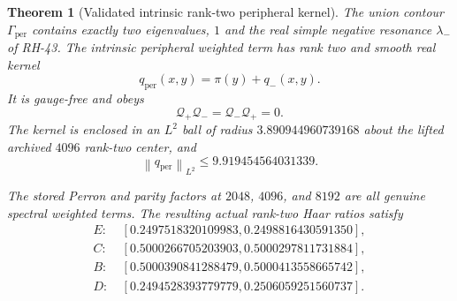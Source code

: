 \documentclass[11pt]{article}
\newtheorem{theorem}{Theorem}[section]
\theoremstyle{definition}
\theoremstyle{remark}
\newcommand{\cQ}{\mathcal Q}
\newcommand{\norm}[1]{\left\lVert #1\right\rVert}
\begin{document}
\begin{theorem}[Validated intrinsic rank-two peripheral kernel]
\label{thm:rank-two}
The union contour $\Gamma_{\mathrm{per}}$ contains exactly two eigenvalues,
$1$ and the real simple negative resonance $\lambda_-$ of RH-43.  The
intrinsic peripheral weighted term has rank two and smooth real kernel
\begin{equation}
 q_{\mathrm{per}}(x,y)=\pi(y)+q_-(x,y).
 \label{eq:rank-two-kernel}
\end{equation}
It is gauge-free and obeys
\begin{equation}
 \cQ_+\cQ_-=\cQ_-\cQ_+=0.
 \label{eq:weighted-orthogonality}
\end{equation}
The kernel is enclosed in an $L^2$ ball of radius
$3.890944960739168$ about the lifted archived $4096$ rank-two center, and
\begin{equation}
 \norm{q_{\mathrm{per}}}_{L^2}\le9.919454564031339.
 \label{eq:rank-two-hs}
\end{equation}

The stored Perron and parity factors at $2048$, $4096$, and $8192$ are all
genuine spectral weighted terms.  The resulting actual rank-two Haar ratios
satisfy
\begin{align}
 E:&\ [0.2497518320109983,0.2498816430591350],
 \nonumber\\
 C:&\ [0.5000266705203903,0.5000297811731884],
 \nonumber\\
 B:&\ [0.5000390841288479,0.5000413558665742],
 \nonumber\\
 D:&\ [0.2494528393779779,0.2506059251560737].
 \label{eq:rank-two-ratios}
\end{align}
\end{theorem}
\end{document}

